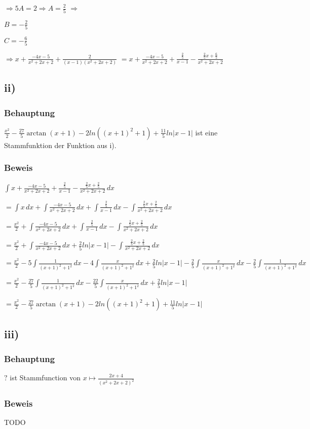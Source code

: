 $\Rightarrow 5A = 2 \Rightarrow A = \frac{2}{5}$
$ \Rightarrow $

$B = -\frac{2}{5}$

$C = -\frac{6}{5}$

$\Rightarrow x + \frac{-4x-5}{x^2+2x+2} + \frac{2}{(x-1)(x^2+2x+2)}$
$=  x + \frac{-4x-5}{x^2+2x+2} + \frac{\frac{2}{5}}{x-1} - \frac{\frac{2}{5}x+\frac{6}{5}}{x^2+2x+2}$

\subsection*{ii)}

\subsubsection*{Behauptung}

$\frac{x^2}{2} - \frac{27}{5}\arctan(x+1) - 2 ln((x+1)^2+1) + \frac{11}{5}ln|x-1|$ ist eine Stammfunktion der Funktion aus i).

\subsubsection*{Beweis}

$\int x + \frac{-4x-5}{x^2+2x+2}+\frac{\frac{2}{5}}{x-1}-\frac{\frac{2}{5}x+\frac{2}{5}}{x^2+2x+2}\,dx$

$ = \int x \,dx + \int \frac{-4x-5}{x^2+2x+2} \,dx + \int \frac{\frac{2}{5}}{x-1} \,dx - \int \frac{\frac{2}{5}x+\frac{2}{5}}{x^2+2x+2}\,dx$

$ = \frac{x^2}{2} + \int \frac{-4x-5}{x^2+2x+2} \,dx + \int \frac{\frac{2}{5}}{x-1} \,dx - \int \frac{\frac{2}{5}x+\frac{2}{5}}{x^2+2x+2}\,dx$


$ = \frac{x^2}{2} + \int \frac{-4x-5}{x^2+2x+2} \,dx + \frac{2}{5}ln|x-1| - \int \frac{\frac{2}{5}x+\frac{2}{5}}{x^2+2x+2}\,dx$

$ = \frac{x^2}{2} - 5\int \frac{1}{(x+1)^2+1^2} \,dx  -4 \int \frac{x}{(x+1)^2+1^2} \,dx + \frac{2}{5}ln|x-1| - \frac{2}{5}\int \frac{x}{(x+1)^2+1^2}\,dx - \frac{2}{5}\int \frac{1}{(x+1)^2+1^2}\,dx$

$ = \frac{x^2}{2} - \frac{27}{5}\int \frac{1}{(x+1)^2+1^2} \,dx  - \frac{22}{5} \int \frac{x}{(x+1)^2+1^2} \,dx + \frac{2}{5}ln|x-1|$

$ = \frac{x^2}{2} - \frac{27}{5}\arctan(x+1) - 2 ln((x+1)^2+1) + \frac{11}{5}ln|x-1|$

\subsection*{iii)}

\subsubsection*{Behauptung}

$ ? $ ist Stammfunction von $x \mapsto \frac{2x+4}{(x^2+2x+2)^2}$

\subsubsection*{Beweis}

TODO